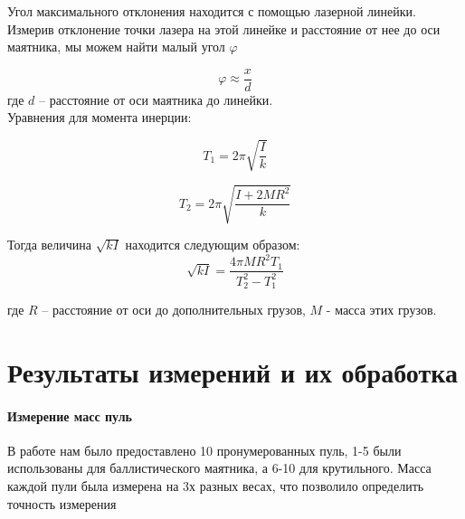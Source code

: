 \documentclass[a4paper,12pt]{article}
\begin{document}
	Угол максимального отклонения находится с помощью лазерной линейки. Измерив отклонение точки лазера на этой линейке и расстояние от нее до оси маятника, мы можем найти малый угол $\varphi$
	
	\begin{equation}
		\label{varphi2}
		\varphi\approx\frac{x}{d}
	\end{equation}
	где $d$ -- расстояние от оси маятника до линейки.\\
	
	Уравнения для момента инерции:
	
	\begin{equation}
		\label{T1}
		T_1=2\pi\sqrt{\frac{I}{k}}
	\end{equation}
	
	\begin{equation}
		\label{T2}
		T_2=2\pi\sqrt{\frac{I+2MR^2}{k}}
	\end{equation}
	
	Тогда величина $\sqrt{kI}$ находится следующим образом:
	\begin{equation}
		\label{kI}
		\sqrt{kI}=\frac{4\pi MR^2 T_1}{T_2^2-T_1^2}
	\end{equation}
	
	где $R$ -- расстояние от оси до дополнительных грузов, $M$ - масса этих грузов.
	
	\section{Результаты измерений и их обработка}
	
	\paragraph{Измерение масс пуль}
	
	В работе нам было предоставлено 10 пронумерованных пуль, 1-5 были использованы для баллистического маятника, а 6-10 для крутильного. Масса каждой пули была измерена на 3х разных весах, что позволило определить точность измерения\\
	
\end{document}
